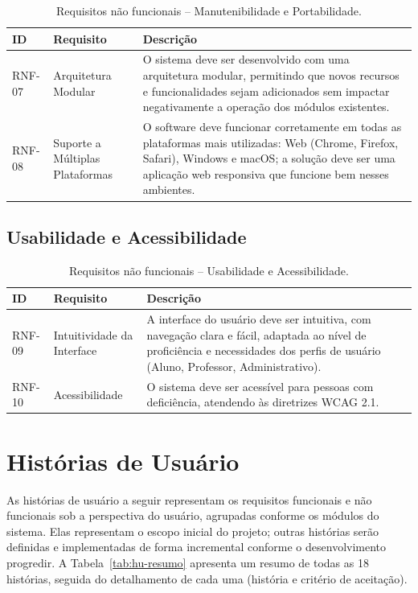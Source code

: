 \begin{table}[H]
\centering
\caption{Requisitos não funcionais -- Manutenibilidade e Portabilidade.}
\begin{tabularx}{\textwidth}{p{} p{} X}
\toprule
\textbf{ID} & \textbf{Requisito} & \textbf{Descrição} \\
\midrule
RNF-07 & Arquitetura Modular & O sistema deve ser desenvolvido com uma arquitetura modular, permitindo que novos recursos e funcionalidades sejam adicionados sem impactar negativamente a operação dos módulos existentes. \\
RNF-08 & Suporte a Múltiplas Plataformas & O software deve funcionar corretamente em todas as plataformas mais utilizadas: Web (Chrome, Firefox, Safari), Windows e macOS; a solução deve ser uma aplicação web responsiva que funcione bem nesses ambientes. \\
\bottomrule
\end{tabularx}
\end{table}

\subsection{Usabilidade e Acessibilidade}

\begin{table}[H]
\centering
\caption{Requisitos não funcionais -- Usabilidade e Acessibilidade.}
\begin{tabularx}{\textwidth}{p{} p{} X}
\toprule
\textbf{ID} & \textbf{Requisito} & \textbf{Descrição} \\
\midrule
RNF-09 & Intuitividade da Interface & A interface do usuário deve ser intuitiva, com navegação clara e fácil, adaptada ao nível de proficiência e necessidades dos perfis de usuário (Aluno, Professor, Administrativo). \\
RNF-10 & Acessibilidade & O sistema deve ser acessível para pessoas com deficiência, atendendo às diretrizes WCAG 2.1. \\
\bottomrule
\end{tabularx}
\end{table}

\section{Histórias de Usuário}

As histórias de usuário a seguir representam os requisitos funcionais e não
funcionais sob a perspectiva do usuário, agrupadas conforme os módulos do
sistema. Elas representam o escopo inicial do projeto; outras histórias
serão definidas e implementadas de forma incremental conforme o
desenvolvimento progredir. A Tabela~\ref{tab:hu-resumo} apresenta um resumo
de todas as 18 histórias, seguida do detalhamento de cada uma (história e
critério de aceitação).

